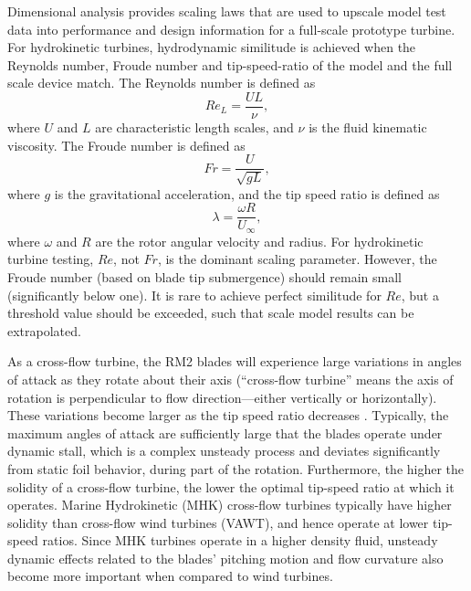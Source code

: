 \documentclass[10pt,letterpaper]{article}
\begin{document}
Dimensional analysis provides scaling laws that are used to upscale model test
data into performance and design information for a full-scale prototype turbine.
For hydrokinetic turbines, hydrodynamic similitude is achieved when the Reynolds
number, Froude number and tip-speed-ratio of the model and the full scale device
match. The Reynolds number is defined as
\begin{equation}
Re_L = \frac{UL}{\nu},
\label{eq:Re}
\end{equation}
where $U$ and $L$ are characteristic length scales, and $\nu$ is the fluid
kinematic viscosity. The Froude number is defined as
\begin{equation}
Fr = \frac{U}{\sqrt{gL}},
\label{eq:Fr}
\end{equation}
where $g$ is the gravitational acceleration, and the tip speed ratio is defined
as
\begin{equation}
\lambda=\frac{\omega R}{U_\infty},
\end{equation}
where $\omega$ and $R$ are the rotor angular velocity and radius.
For hydrokinetic turbine testing, $Re$, not $Fr$, is the dominant scaling
parameter. However, the Froude number (based on blade tip submergence) should
remain small (significantly below one). It is rare to achieve perfect similitude
for $Re$, but a threshold value should be exceeded, such that scale model
results can be extrapolated.

As a cross-flow turbine, the RM2 blades will experience large variations in
angles of attack as they rotate about their axis (``cross-flow turbine'' means
the axis of rotation is perpendicular to flow direction---either vertically or
horizontally). These variations become larger as the tip speed ratio decreases
\cite{Para2002}. Typically, the maximum angles of attack are sufficiently large
that the blades operate under dynamic stall, which is a complex unsteady process
and deviates significantly from static foil behavior, during part of the
rotation. Furthermore, the higher the solidity of a cross-flow turbine, the
lower the optimal tip-speed ratio at which it operates. Marine Hydrokinetic
(MHK) cross-flow turbines typically have higher solidity than cross-flow wind
turbines (VAWT), and hence operate at lower tip-speed ratios. Since MHK turbines
operate in a higher density fluid, unsteady dynamic effects related to the
blades' pitching motion and flow curvature also become more important when
compared to wind turbines.
\end{document}
